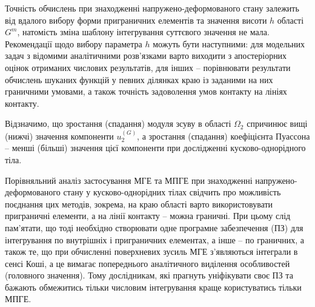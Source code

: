 Точність обчислень при знаходженні напружено-деформованого стану залежить від вдалого вибору форми приграничних
елементів та значення висоти $h$ області $G^{m}$, натомість зміна шаблону інтегрування суттєвого значення не
мала. Рекомендації щодо вибору параметра $h$ можуть бути наступними: для модельних задач з відомими аналітичними
розв'язками варто виходити з апостеріорних оцінок отриманих числових результатів, для інших -- порівнювати результати
обчислень шуканих функцій у певних ділянках краю із заданими на них граничними умовами, а також точність задоволення
умов контакту на лініях контакту.

Відзначимо, що зростання (спадання) модуля зсуву в області $\Omega_{2}$ спричинює вищі (нижчі) значення компоненти
$u_{2}^{(G)}$, а зростання (спадання) коефіцієнта Пуассона -- менші (більші) значення цієї компоненти при дослідженні
кусково-однорідного тіла.

Порівняльний аналіз застосування МГЕ та МПГЕ при знаходженні напружено-деформованого стану у кусково-однорідних тілах
свідчить про можливість поєднання цих методів, зокрема, на краю області варто використовувати приграничні елементи, а на
лінії контакту -- можна граничні. При цьому слід пам'ятати, що тоді необхідно створювати одне програмне забезпечення
(ПЗ) для інтегрування по внутрішніх і приграничних елементах, а інше -- по граничних, а також те, що при обчисленні
поверхневих зусиль МГЕ з'являються інтеграли в сенсі Коші, а це вимагає попереднього аналітичного виділення особливостей
(головного значення). Тому дослідникам, які прагнуть уніфікувати своє ПЗ та бажають обмежитись тільки числовим
інтегрування краще користуватись тільки МПГЕ.

